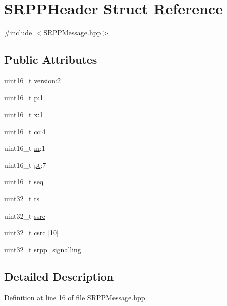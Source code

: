 \hypertarget{struct_s_r_p_p_header}{
\section{SRPPHeader Struct Reference}
\label{struct_s_r_p_p_header}
}


{\ttfamily \#include $<$SRPPMessage.hpp$>$}

\subsection*{Public Attributes}
\begin{DoxyCompactItemize}
\item 
uint16\_\-t \hyperlink{struct_s_r_p_p_header_a1e157a5384ef3d1691a3255b2b85ecc4}{version}:2
\item 
uint16\_\-t \hyperlink{struct_s_r_p_p_header_a5fea95f882c0d6dc145db5206179d09a}{p}:1
\item 
uint16\_\-t \hyperlink{struct_s_r_p_p_header_a4a16f54f96df9130f56a1b9e3f8348fa}{x}:1
\item 
uint16\_\-t \hyperlink{struct_s_r_p_p_header_abee69fd2801a6ead6de88d5989e26af7}{cc}:4
\item 
uint16\_\-t \hyperlink{struct_s_r_p_p_header_a873e88c91c1dff5650ff8cef39da6c5e}{m}:1
\item 
uint16\_\-t \hyperlink{struct_s_r_p_p_header_a14ab4eb6c4e2a8fd74d096e46889e9fd}{pt}:7
\item 
uint16\_\-t \hyperlink{struct_s_r_p_p_header_a4d1b2c6ff25a9a2b63c892a6bc6ed85a}{seq}
\item 
uint32\_\-t \hyperlink{struct_s_r_p_p_header_a52ccba459cf97fe589c90c4963214564}{ts}
\item 
uint32\_\-t \hyperlink{struct_s_r_p_p_header_abf4b7d9bb620d2535acc1c804d61334b}{ssrc}
\item 
uint32\_\-t \hyperlink{struct_s_r_p_p_header_a8f6ad282b736de43846c450e20976348}{csrc} \mbox{[}10\mbox{]}
\item 
uint32\_\-t \hyperlink{struct_s_r_p_p_header_a1868f11a71da0fc414496fa7bfc51600}{srpp\_\-signalling}
\end{DoxyCompactItemize}


\subsection{Detailed Description}


Definition at line 16 of file SRPPMessage.hpp.



